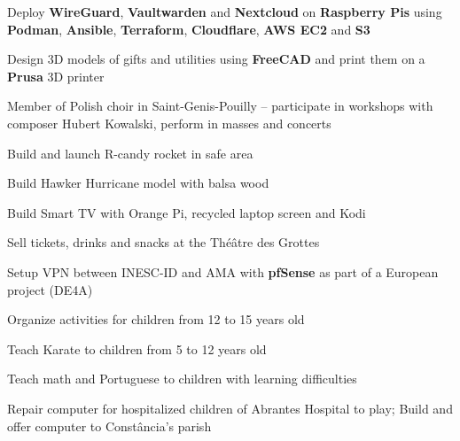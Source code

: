 \documentclass[10pt,a4paper,ragged2e,withhyper]{altacv}
\begin{document}
\begin{paracol}{2}
\switchcolumn


\smallskip
{}
\smallskip
{}
\smallskip
{}
\smallskip
{}

\medskip


\small Deploy \textbf{WireGuard}, \textbf{Vaultwarden} and \textbf{Nextcloud} on \textbf{Raspberry Pis} using \textbf{Podman}, \textbf{Ansible}, \textbf{Terraform}, \textbf{Cloudflare}, \textbf{AWS EC2} and \textbf{S3}

\medskip

\small Design 3D models of gifts and utilities using \textbf{FreeCAD} and print them on a \textbf{Prusa} 3D printer

\medskip

\small Member of Polish choir in Saint-Genis-Pouilly -- participate in workshops with composer Hubert Kowalski, perform in masses and concerts

\medskip

\small Build and launch R-candy rocket in safe area

\medskip

\small Build Hawker Hurricane model with balsa wood

\medskip

\small Build Smart TV with Orange Pi, recycled laptop screen and Kodi


\small Sell tickets, drinks and snacks at the Théâtre des Grottes

\medskip

\small Setup VPN between INESC-ID and AMA with \textbf{pfSense} as part of a European project (DE4A)

\medskip

\small Organize activities for children from 12 to 15 years old

\medskip

\small Teach Karate to children from 5 to 12 years old

\medskip

\small Teach math and Portuguese to children with learning difficulties

\medskip

\small Repair computer for hospitalized children of Abrantes Hospital to play; Build and offer computer to Constância's parish

\end{paracol}
\end{document}
